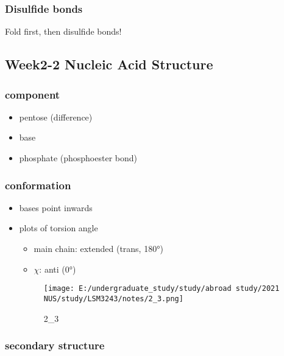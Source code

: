 \documentclass[]{article}
\begin{document}
\hypertarget{disulfide-bonds}{%
\subsubsection{Disulfide bonds}\label{disulfide-bonds}}

Fold first, then disulfide bonds!

\hypertarget{week2-2-nucleic-acid-structure}{%
\subsection{Week2-2 Nucleic Acid
Structure}\label{week2-2-nucleic-acid-structure}}

\hypertarget{component}{%
\subsubsection{component}\label{component}}

\begin{itemize}
\item
  pentose (difference)
\item
  base
\item
  phosphate (phosphoester bond)
\end{itemize}

\hypertarget{conformation}{%
\subsubsection{conformation}\label{conformation}}

\begin{itemize}
\item
  bases point inwards
\item
  plots of torsion angle

  \begin{itemize}
  \item
    main chain: extended (trans, 180°)
  \item
    \(\chi\): anti (0°)
  \end{itemize}

  \begin{figure}
  \centering
  \texttt{[image: E:/undergraduate\_study/study/abroad study/2021 NUS/study/LSM3243/notes/2\_3.png]}
  \caption{2\_3}
  \end{figure}
\end{itemize}

\hypertarget{secondary-structure}{%
\subsubsection{secondary structure}\label{secondary-structure}}
\end{document}

